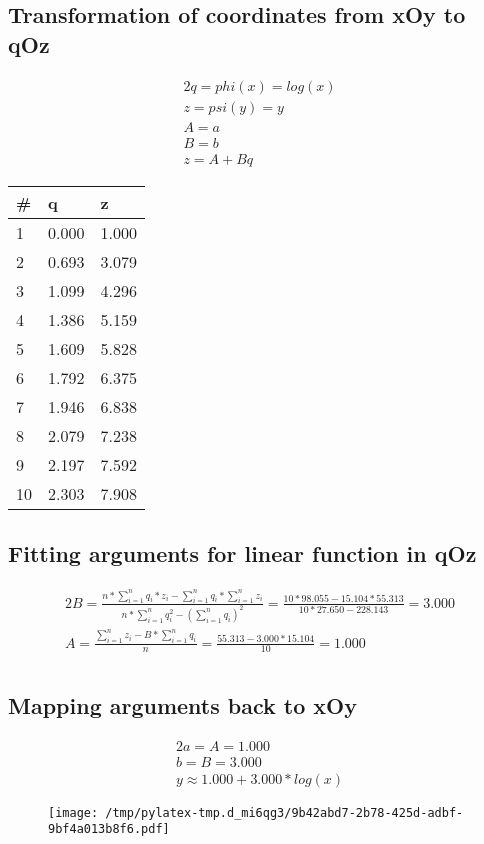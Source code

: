 \documentclass{article}%
\begin{document}
\subsection{Transformation of coordinates from xOy to qOz}%
\label{subsec:TransformationofcoordinatesfromxOytoqOz}%
\begin{alignat*}{2}%
q = phi(x) = log(x) \\%
z = psi(y) = y \\%
A = a \\%
B = b \\%
z = A + Bq%
\end{alignat*}

%
\begin{longtable}{l l l}%
\hline%
\#&q&z\\%
\hline%
\endhead%
1&0.000&1.000\\%
2&0.693&3.079\\%
3&1.099&4.296\\%
4&1.386&5.159\\%
5&1.609&5.828\\%
6&1.792&6.375\\%
7&1.946&6.838\\%
8&2.079&7.238\\%
9&2.197&7.592\\%
10&2.303&7.908\\%
\end{longtable}%
\subsection{Fitting arguments for linear function in qOz}%
\label{subsec:FittingargumentsforlinearfunctioninqOz}%
\begin{alignat*}{2}%
B
                    = \frac {n * \sum\limits_{i = 1}^n {q_i * z_i} - \sum\limits_{i = 1}^n {q_i} * \sum\limits_{i = 1}^n {z_i}}
                        {n * \sum\limits_{i = 1}^n {q_i^2} - (\sum\limits_{i = 1}^n {q_i}) ^ 2}
                    = \frac {10 * 98.055 - 15.104 * 55.313}
                        {10 * 27.650 - 228.143}
                    = 3.000 \\%
A
                    = \frac {\sum\limits_{i = 1}^n {z_i} - B * \sum\limits_{i = 1}^{n} {q_i}} n
                    = \frac {55.313 - 3.000 * 15.104} {10}
                    = 1.000 \\%
\end{alignat*}

%
\subsection{Mapping arguments back to xOy}%
\label{subsec:MappingargumentsbacktoxOy}%
\begin{alignat*}{2}%
a = A = 1.000 \\%
b = B = 3.000 \\%
y \approx1.000 + 3.000 * log(x)%
\end{alignat*}%


\begin{figure}[htbp]%
\centering%
\texttt{[image: /tmp/pylatex-tmp.d\_mi6qg3/9b42abd7-2b78-425d-adbf-9bf4a013b8f6.pdf]}%
\end{figure}

%
\end{document}
